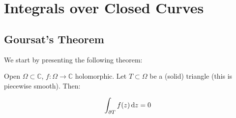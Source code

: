 \setcounter{section}{0}
\setcounter{theorem}{0}



\section{Integrals over Closed Curves}

\subsection{Goursat's Theorem}
We start by presenting the following theorem:


\begin{theorem}
Open $\Omega \subset \mathbb{C}$, $f: \Omega \rightarrow \mathbb{C}$ holomorphic. Let $T\subset \Omega$ be a (solid) triangle (this is piecewise smooth). Then:

\begin{align*}
    \int_{\partial T} f(z)  \dif z =0\\
\end{align*}

\end{theorem}


